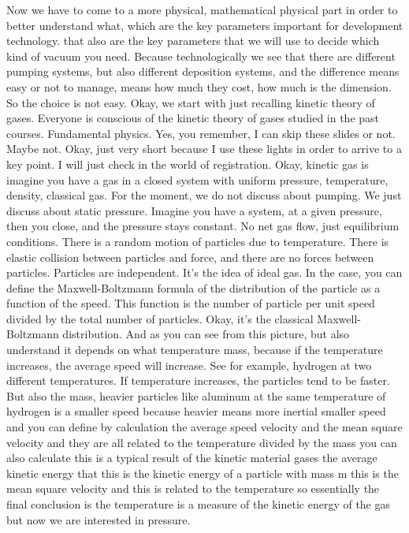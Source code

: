 Now we have to come to a more physical, mathematical physical part in order to better understand what, which are the key parameters important for development technology. that also are the key parameters that we will use to decide which kind of vacuum you need. Because technologically we see that there are different pumping systems, but also different deposition systems, and the difference means easy or not to manage, means how much they cost, how much is the dimension. So the choice is not easy. Okay, we start with just recalling kinetic theory of gases. Everyone is conscious of the kinetic theory of gases studied in the past courses. Fundamental physics. Yes, you remember, I can skip these slides or not. Maybe not. Okay, just very short because I use these lights in order to arrive to a key point. I will just check in the world of registration. Okay, kinetic gas is imagine you have a gas in a closed system with uniform pressure, temperature, density, classical gas. For the moment, we do not discuss about pumping. We just discuss about static pressure. Imagine you have a system, at a given pressure, then you close, and the pressure stays constant. No net gas flow, just equilibrium conditions. There is a random motion of particles due to temperature. There is elastic collision between particles and force, and there are no forces between particles. Particles are independent. It's the idea of ideal gas. In the case, you can define the Maxwell-Boltzmann formula of the distribution of the particle as a function of the speed. This function is the number of particle per unit speed divided by the total number of particles. Okay, it's the classical Maxwell-Boltzmann distribution. And as you can see from this picture, but also understand it depends on what temperature mass, because if the temperature increases, the average speed will increase. See for example, hydrogen at two different temperatures. If temperature increases, the particles tend to be faster. But also the mass, heavier particles like aluminum at the same temperature of hydrogen is a smaller speed because heavier means more inertial smaller speed and you can define by calculation the average speed velocity and the mean square velocity and they are all related to the temperature divided by the mass you can also calculate this is a typical result of the kinetic material gases the average kinetic energy that this is the kinetic energy of a particle with mass m this is the mean square velocity and this is related to the temperature so essentially the final conclusion is the temperature is a measure of the kinetic energy of the gas but now we are interested in pressure.
